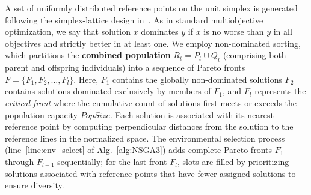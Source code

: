 \documentclass[a4paper,fleqn]{cas-sc}
\begin{document}
A set of uniformly distributed reference points on the unit simplex is generated following the simplex-lattice design in~\cite{deb2014nsga3}.
As in standard multiobjective optimization, we say that solution $x$ dominates $y$ if $x$ is no worse than $y$ in all objectives and strictly better in at least one. We employ non-dominated sorting, which partitions the \textbf{combined population} $R_t = P_t \cup Q_t$ (comprising both parent and offspring individuals) into a sequence of Pareto fronts $F = \{F_1, F_2, \dots, F_l\}$.
Here, $F_1$ contains the globally non-dominated solutions
$F_2$ contains solutions dominated exclusively by members of $F_1$, and $F_l$ represents the \textit{critical front} where the cumulative count of solutions first meets or exceeds the population capacity $\textit{PopSize}$.
%
Each solution is associated with its nearest reference point by computing perpendicular distances from the solution to the reference lines in the normalized space. 
The environmental selection process (line~\ref{line:env_select} of Alg.~\ref{alg:NSGA3}) adds complete Pareto fronts $F_1$ through $F_{l-1}$ sequentially; for the last front $F_l$, slots are filled by prioritizing solutions associated with reference points that have fewer assigned solutions to ensure diversity.
\end{document}
